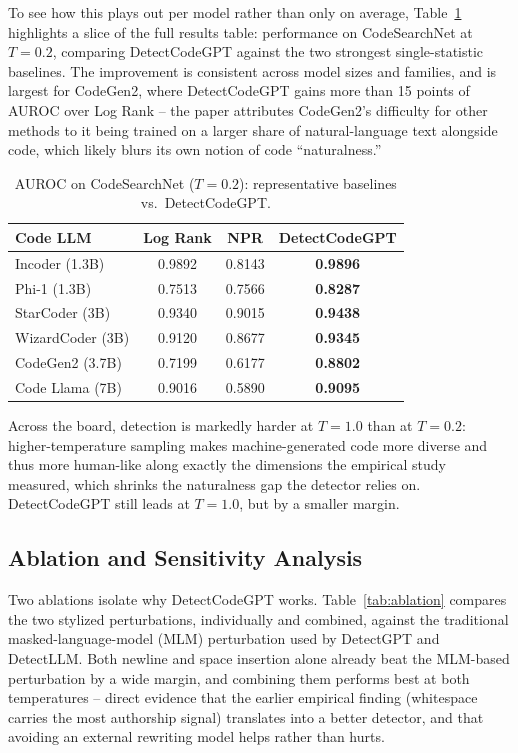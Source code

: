 \documentclass[manuscript,review]{acmart}
\begin{document}
To see how this plays out per model rather than only on average, Table~\ref{tab:csn02} highlights a slice of the full results table: performance on CodeSearchNet at $T=0.2$, comparing DetectCodeGPT against the two strongest single-statistic baselines. The improvement is consistent across model sizes and families, and is largest for CodeGen2, where DetectCodeGPT gains more than 15 points of AUROC over Log Rank -- the paper attributes CodeGen2's difficulty for other methods to it being trained on a larger share of natural-language text alongside code, which likely blurs its own notion of code ``naturalness.''

\begin{table}[t]
\caption{AUROC on CodeSearchNet ($T=0.2$): representative baselines vs.\ DetectCodeGPT.}
\label{tab:csn02}
\begin{tabular}{@{}lccc@{}}
\toprule
\textbf{Code LLM} & \textbf{Log Rank} & \textbf{NPR} & \textbf{DetectCodeGPT} \\
\midrule
Incoder (1.3B)     & 0.9892 & 0.8143 & \textbf{0.9896} \\
Phi-1 (1.3B)       & 0.7513 & 0.7566 & \textbf{0.8287} \\
StarCoder (3B)     & 0.9340 & 0.9015 & \textbf{0.9438} \\
WizardCoder (3B)   & 0.9120 & 0.8677 & \textbf{0.9345} \\
CodeGen2 (3.7B)    & 0.7199 & 0.6177 & \textbf{0.8802} \\
Code Llama (7B)    & 0.9016 & 0.5890 & \textbf{0.9095} \\
\bottomrule
\end{tabular}
\end{table}

Across the board, detection is markedly harder at $T=1.0$ than at $T=0.2$: higher-temperature sampling makes machine-generated code more diverse and thus more human-like along exactly the dimensions the empirical study measured, which shrinks the naturalness gap the detector relies on. DetectCodeGPT still leads at $T=1.0$, but by a smaller margin.

\subsection{Ablation and Sensitivity Analysis}
Two ablations isolate why DetectCodeGPT works. Table~\ref{tab:ablation} compares the two stylized perturbations, individually and combined, against the traditional masked-language-model (MLM) perturbation used by DetectGPT and DetectLLM. Both newline and space insertion alone already beat the MLM-based perturbation by a wide margin, and combining them performs best at both temperatures -- direct evidence that the earlier empirical finding (whitespace carries the most authorship signal) translates into a better detector, and that avoiding an external rewriting model helps rather than hurts.
\end{document}
